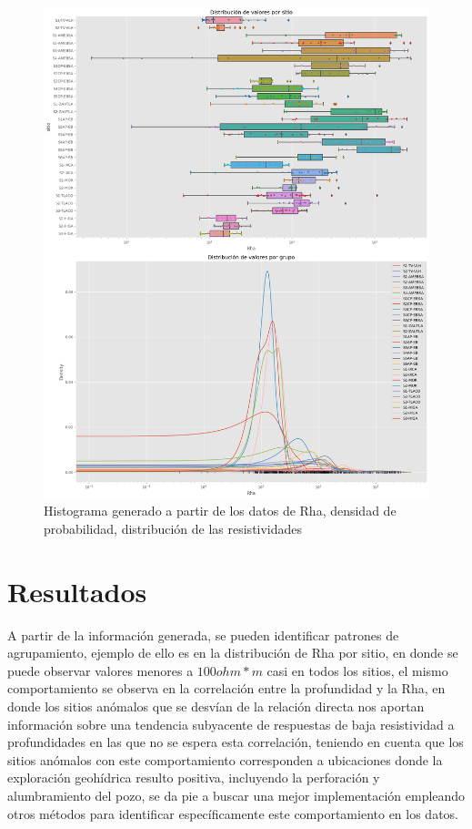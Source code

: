 \documentclass[sn-mathphys,Numbered]{sn-jnl}%
\theoremstyle{thmstyleone}%
\theoremstyle{thmstyletwo}%
\theoremstyle{thmstylethree}%
\begin{document}
\begin{figure}[H]
	\centering
	\includegraphics[width=1.1\linewidth]{imagenes/distribucion de estadistica por sitio}
	\caption[Figura]{Histograma generado a partir de los datos de Rha, densidad de probabilidad, distribución de las resistividades}
	\label{fig:Diagrama de densidad}
\end{figure}


\section{Resultados}\label{sec4}

A partir de la información generada, se pueden identificar patrones de agrupamiento, ejemplo de ello es en la distribución de Rha por sitio, en donde se puede observar valores menores a $100 ohm*m$ casi en todos los sitios, el mismo comportamiento se observa en la correlación entre la profundidad y la Rha, en donde los sitios anómalos que se desvían de la relación directa nos aportan información sobre una tendencia subyacente de respuestas de baja resistividad a profundidades en las que no se espera esta correlación, teniendo en cuenta que los sitios anómalos con este comportamiento corresponden a ubicaciones donde la exploración geohídrica resulto positiva, incluyendo la perforación y alumbramiento del pozo, se da pie a buscar una mejor implementación empleando otros métodos para identificar específicamente este comportamiento en los datos.
\end{document}
